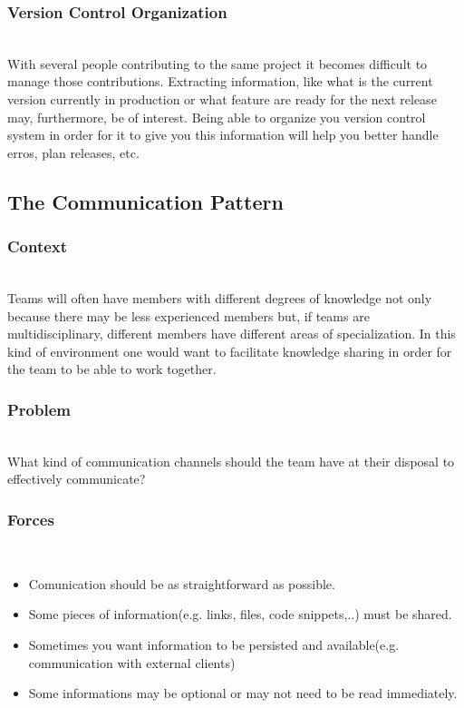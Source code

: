 \documentclass{llncs}
\begin{document}
    \subsubsection{Version Control Organization}~\\
    With several people contributing to the same project it becomes difficult to manage those contributions. Extracting information, like what is the current version currently in production or what feature are ready for the next release may, furthermore, be of interest. Being able to organize you version control system in order for it to give you this information will help you better handle erros, plan releases, etc.

	\subsection{The Communication Pattern}
		\subsubsection{Context}~\\

		Teams will often have members with different degrees of knowledge not only because there may be less experienced members but, if teams are multidisciplinary, different members have different areas of specialization.
		In this kind of environment one would want to facilitate knowledge sharing in order for the team to be able to work together.

		\subsubsection{Problem}~\\

		What kind of communication channels should the team have at their disposal to effectively communicate?

		\subsubsection{Forces}~\\
		\begin{itemize}
			\item Comunication should be as straightforward as possible.
			\item Some pieces of information(e.g. links, files, code snippets,..) must be shared.
			\item Sometimes you want information to be persisted and available(e.g. communication with external clients)
			\item Some informations may be optional or may not need to be read immediately.
		\end{itemize}
\end{document}
